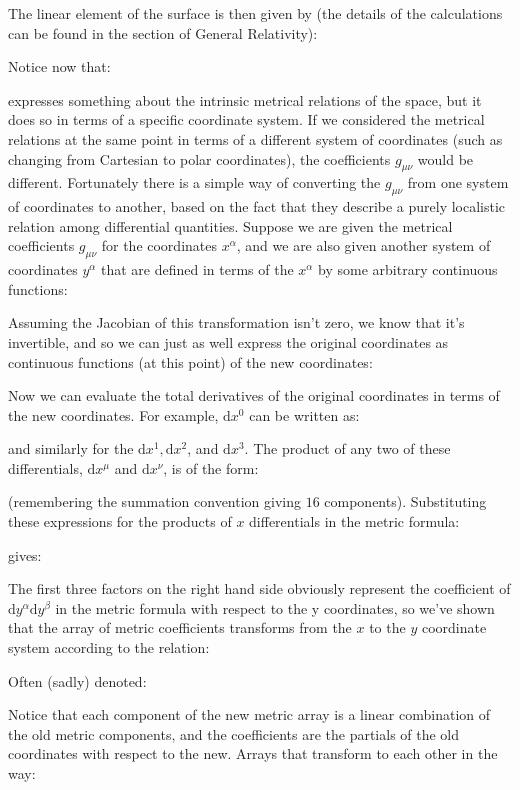 	The linear element of the surface is then given by (the details of the calculations can be found in the section of General Relativity):
	
	Notice now that:
	
	expresses something about the intrinsic metrical relations of the space, but it does so in terms of a specific coordinate system. If we considered the metrical relations at the same point in terms of a different system of coordinates (such as changing from Cartesian to polar coordinates), the coefficients $g_{\mu\nu}$ would be different. Fortunately there is a simple way of converting the $g_{\mu\nu}$ from one system of coordinates to another, based on the fact that they describe a purely localistic relation among differential quantities. Suppose we are given the metrical coefficients $g_{\mu\nu}$ for the coordinates $x^\alpha$, and we are also given another system of coordinates $y^\alpha$ that are defined in terms of the $x^\alpha$ by some arbitrary continuous functions:
	
	Assuming the Jacobian of this transformation isn't zero, we know that it's invertible, and so we can just as well express the original coordinates as continuous functions (at this point) of the new coordinates:
	
	Now we can evaluate the total derivatives of the original coordinates in terms of the new coordinates. For example, $\mathrm{d}x^0$ can be written as:
	
	and similarly for the $\mathrm{d}x^1, \mathrm{d}x^2$, and $\mathrm{d}x^3$. The product of any two of these differentials, $\mathrm{d}x^\mu$ and $\mathrm{d}x^\nu$, is of the form:
	
	(remembering the summation convention giving $16$ components). Substituting these expressions for the products of $x$ differentials in the metric formula:
	
	gives:
	
	The first three factors on the right hand side obviously represent the coefficient of $\mathrm{d}y^\alpha\mathrm{d}y^\beta$ in the metric formula with respect to the y coordinates, so we've shown that the array of metric coefficients transforms from the $x$ to the $y$ coordinate system according to the relation:
	
	Often (sadly) denoted:
	
	Notice that each component of the new metric array is a linear combination of the old metric components, and the coefficients are the partials of the old coordinates with respect to the new. Arrays  that transform to each other in the way:
	
